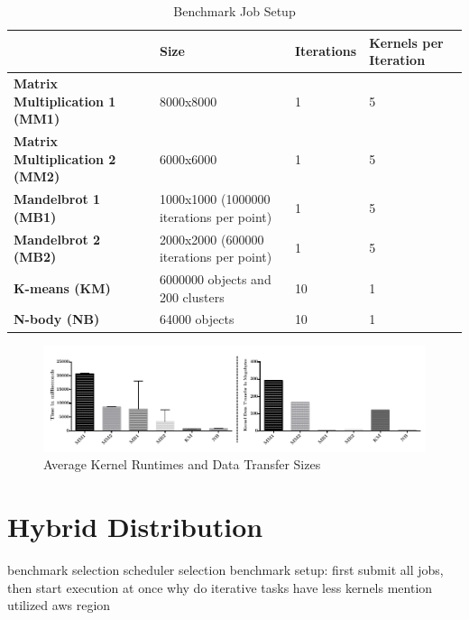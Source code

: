 \begin{table}[!htb]
	\centering
	\begin{adjustbox}{width=0.95\textwidth}
		\small
		\begin{tabular}{l | l | l | l}
			~							& \textbf{Size}		& \textbf{Iterations}	& \textbf{Kernels per Iteration} \\
			\hline
			\textbf{Matrix Multiplication 1 (MM1)} 	& 8000x8000  								& 1 	& 5 \\
			\textbf{Matrix Multiplication 2 (MM2)}     & 6000x6000  								& 1		& 5 \\
			\textbf{Mandelbrot 1 (MB1)}     			& 1000x1000 (1000000 iterations per point) 	& 1		& 5 \\
			\textbf{Mandelbrot 2 (MB2)}     			& 2000x2000 (600000 iterations per point)  	& 1		& 5 \\
			\textbf{K-means (KM)}          			& 6000000 objects and 200 clusters  		& 10	& 1 \\
			\textbf{N-body (NB)}    		 			& 64000 objects  							& 10	& 1 \\		
		\end{tabular}
	\end{adjustbox}
	
	\caption{Benchmark Job Setup}
	\label{table:benchmark_job_setup}
\end{table}

\begin{figure}[H]
	
	\includegraphics[width=1.0\textwidth]{images/benchmark_kernel_data_transfers.pdf}
	\centering
	\caption{Average Kernel Runtimes and Data Transfer Sizes}
	\label{img:benchmark_kernel_attributes}
\end{figure}

\section{Hybrid Distribution}



benchmark selection
scheduler selection
benchmark setup: first submit all jobs, then start execution at once
why do iterative tasks have less kernels
mention utilized aws region